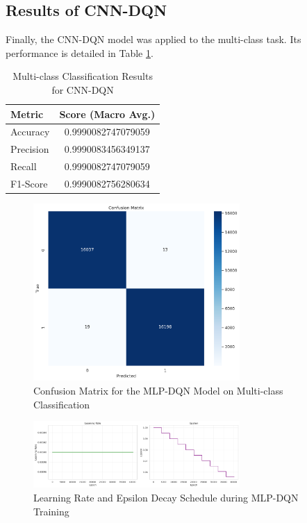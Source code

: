 \documentclass[16pt]{report}
\begin{document}
\subsection{Results of CNN-DQN}
Finally, the CNN-DQN model was applied to the multi-class task. Its performance is detailed in Table \ref{tab:multi_cnn_dqn_results}.

\begin{table}[H]
    \centering
    \caption{Multi-class Classification Results for CNN-DQN}
    \label{tab:multi_cnn_dqn_results}
    \begin{tabular}{@{}lc@{}}
        \toprule
        \textbf{Metric} & \textbf{Score (Macro Avg.)} \\
        \midrule
        Accuracy & 0.9990082747079059 \\
        Precision & 0.9990083456349137 \\
        Recall & 0.9990082747079059 \\
        F1-Score & 0.9990082756280634 \\
        \bottomrule
    \end{tabular}
\end{table}

\begin{figure}[H]
    \centering
    \includegraphics[width=0.7\textwidth]{images/double_dqn_cnn_confusion_matrix.png}
    \caption{Confusion Matrix for the MLP-DQN Model on Multi-class Classification}
    \label{fig:ddqn_conf_matrix}
\end{figure}

\begin{figure}[H]
    \centering
    \includegraphics[width=0.7\textwidth]{images/double_dqn_cnn_lr_epsilon.png}
    \caption{Learning Rate and Epsilon Decay Schedule during MLP-DQN Training}
    \label{fig:lr_epsilon}
\end{figure}
\end{document}
